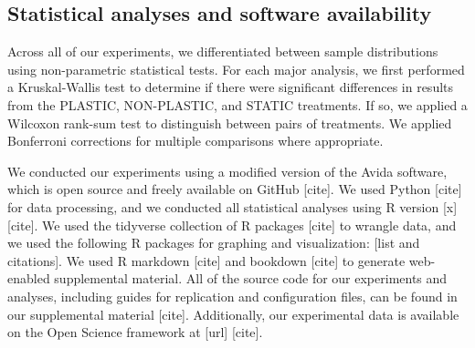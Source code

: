 \vspace{0.5cm}
\subsection{Statistical analyses and software availability}

Across all of our experiments, we differentiated between sample distributions using non-parametric statistical tests.
For each major analysis, we first performed a Kruskal-Wallis test \citep{kruskal_use_1952} to 
determine if there were significant differences in results from the PLASTIC, NON-PLASTIC, and STATIC treatments.
If so, we applied a Wilcoxon rank-sum test \citep{kotz_individual_1992} to distinguish between pairs of treatments.
We applied Bonferroni corrections for multiple comparisons \citep{rice_analyzing_1989} where appropriate.

We conducted our experiments using a modified version of the Avida software, which is open source and freely available on GitHub [cite].
We used Python [cite] for data processing, and we conducted all statistical analyses using R version [x] [cite].
We used the tidyverse collection of R packages [cite] to wrangle data, and we used the following R packages for graphing and visualization: [list and citations].
We used R markdown [cite] and bookdown [cite] to generate web-enabled supplemental material.
All of the source code for our experiments and analyses, including guides for replication and configuration files, can be found in our supplemental material [cite].
Additionally, our experimental data is available on the Open Science framework at [url] [cite].